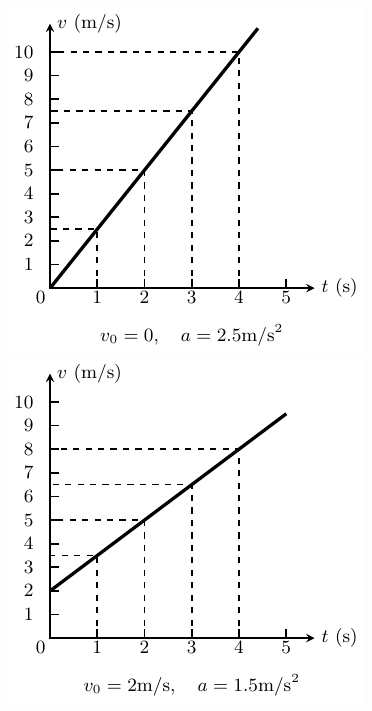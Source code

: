 \begin{figure}[htp]
\centering
    \begin{minipage}[t]{0.48\textwidth}
        \centering
        \includegraphics{fig/A/2-15.pdf}
        \caption{}\label{fig_A_2-15}
    \end{minipage}
    \begin{minipage}[t]{0.48\textwidth}
        \centering
        \includegraphics{fig/A/2-16.pdf}
        \caption{}\label{fig_A_2-16}
    \end{minipage}
\end{figure}

